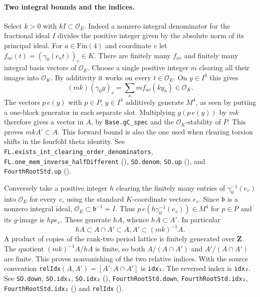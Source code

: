 \paragraph{Two integral bounds and the indices.}\label{r16:std-indices}
Select $k>0$ with $kI\subset\mathcal O_E$. Indeed a nonzero integral
denominator for the fractional ideal $I$ divides the positive integer
given by the absolute norm of its principal ideal. For $a\in\mathrm{Fin}(4)$
and coordinate $v$ let $f_{av}(t)=(\gamma_0(e_a t))_v\in K$.
There are finitely many $f_{av}$ and finitely many integral basis
vectors of $\mathcal O_E$. Choose a single positive integer $m$ clearing
all their images into $\mathcal O_K$. By additivity it works on every
$t\in\mathcal O_E$. On $y\in I^4$ this gives
\[
 (mk)(\gamma_0 y)_v=\sum_a m f_{av}(ky_a)\in\mathcal O_K .
\]
The vectors $p\,e(y)$ with $p\in P$, $y\in I^4$ additively generate
$M^4$, as seen by putting a one-block generator in each separate
slot. Multiplying $g(p\,e(y))$ by $mk$ therefore gives a vector in
$A$, by \nolinkurl{Base.gC_spec} and the $\mathcal O_K$-stability of
$P$. This proves $mk A'\subset A$. This forward bound is also the
one used when clearing torsion shifts in the fourfold theta identity.
See \nolinkurl{FL.exists_int_clearing_order_denominators},
\nolinkurl{FL.one_mem_inverse_halfDifferent}
(),
\nolinkurl{SO.denom}, \nolinkurl{SO.up}
(), and
\nolinkurl{FourthRootStd.up}
().

Conversely take a positive integer $h$ clearing the finitely many
entries of $\gamma_0^{-1}(e_v)$ into $\mathcal O_E$ for every $v$,
using the standard $K$-coordinate vectors $e_v$.
Since $\mathfrak b$ is a nonzero integral ideal,
$\mathcal O_E\subset\mathfrak b^{-1}=I$. Thus
$p\,e(h\gamma_0^{-1}(e_v))\in M^4$ for $p\in P$ and its $g$-image
is $hp e_v$. These generate $hA$, whence $hA\subset A'$.
In particular
\[
 hA\subset A\cap A'\subset A,A'\subset (mk)^{-1}A.
\]
A product of copies of the rank-two period lattice is finitely generated
over $\mathbf Z$. The quotient $(mk)^{-1}A/hA$ is finite, so
both $A/(A\cap A')$ and $A'/(A\cap A')$ are finite. This proves
nonvanishing of the two relative indices. With the source convention
\nolinkurl{relIdx}$(A,A')=[A':A\cap A']$ is
\nolinkurl{idx₁}. The reversed index is \nolinkurl{idx₂}.
See \nolinkurl{SO.down}, \nolinkurl{SO.idx₁}, \nolinkurl{SO.idx₂}
(),
\nolinkurl{FourthRootStd.down}, \nolinkurl{FourthRootStd.idx₁},
\nolinkurl{FourthRootStd.idx₂}
() and
\nolinkurl{relIdx} ().


